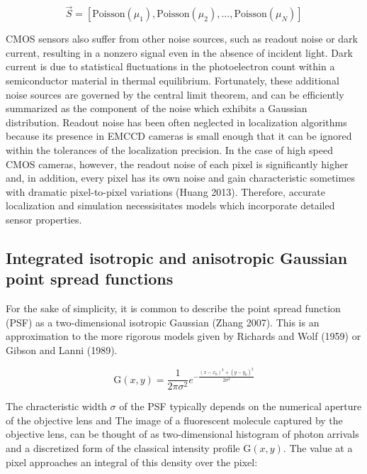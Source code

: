\documentclass{ucetd}
\begin{document}
\begin{equation}
\vec{S} = \left[\mathrm{Poisson}(\mu_{1}), \mathrm{Poisson}(\mu_{2}), ..., \mathrm{Poisson}(\mu_{N})\right]
\end{equation}

CMOS sensors also suffer from other noise sources, such as readout noise or dark current, resulting in a nonzero signal even in the absence of incident light. Dark current is due to statistical fluctuations in the photoelectron count within a semiconductor material in thermal equilibrium. Fortunately, these additional noise sources are governed by the central limit theorem, and can be efficiently summarized as the component of the noise which exhibits a Gaussian distribution. Readout noise has been often neglected in localization algorithms because its presence in EMCCD cameras is small enough that it can be ignored within the tolerances of the localization precision. In the case of high speed CMOS cameras, however, the readout noise of each pixel is significantly higher and, in addition, every pixel has its own noise and gain characteristic sometimes with dramatic pixel-to-pixel variations (Huang 2013). Therefore, accurate localization and simulation necessisitates models which incorporate detailed sensor properties. 


\subsection{Integrated isotropic and anisotropic Gaussian point spread functions}

For the sake of simplicity, it is common to describe the point spread function (PSF) as a two-dimensional isotropic Gaussian (Zhang 2007). This is an approximation to the more rigorous models given by Richards and Wolf (1959) or Gibson and Lanni (1989). 

\begin{equation*}
\mathrm{G}(x,y) = \frac{1}{2\pi\sigma^{2}}e^{-\frac{(x-x_{0})^{2}+(y-y_{0})^{2}}{2\sigma^{2}}}
\end{equation*}

The chracteristic width $\sigma$ of the PSF typically depends on the numerical aperture of the objective lens and The image of a fluorescent molecule captured by the objective lens, can be thought of as two-dimensional histogram of photon arrivals and a discretized form of the classical intensity profile $\mathrm{G}(x,y)$. The value at a pixel approaches an integral of this density over the pixel:
\end{document}
